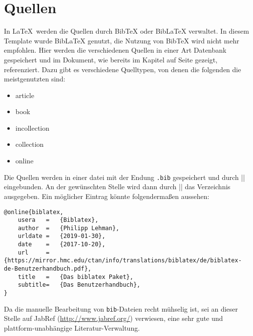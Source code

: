 
\chapter{Quellen}

In \LaTeX\ werden die Quellen durch BibTeX oder BibLaTeX verwaltet. 
In diesem Template wurde BibLaTeX genutzt, die Nutzung von BibTeX wird nicht mehr empfohlen.
Hier werden die verschiedenen Quellen in einer Art Datenbank gespeichert und im Dokument, wie bereits im Kapitel  auf Seite \pageref{ch:zitieren} gezeigt, referenziert. 
Dazu gibt es verschiedene Quelltypen, von denen die folgenden die meistgenutzten sind:\autocite[Vgl.][7]{biblatex}

\begin{itemize}
  \item article
  \item book
  \item incollection
  \item collection
  \item online
\end{itemize}

Die Quellen werden in einer datei mit der Endung \texttt{.bib} gespeichert und durch \befehl|| eingebunden. 
An der gewünschten Stelle wird dann durch \befehl|\printbibliography| das Verzeichnis ausgegeben. 
Ein möglicher Eintrag könnte folgendermaßen aussehen:

\begin{lstlisting}
@online{biblatex,
    usera	=	{Biblatex},
    author	=	{Philipp Lehman},
    urldate	=	{2019-01-30},
    date	=	{2017-10-20},
    url		=	{https://mirror.hmc.edu/ctan/info/translations/biblatex/de/biblatex-de-Benutzerhandbuch.pdf},
    title	=	{Das biblatex Paket},
    subtitle=   {Das Benutzerhandbuch},
}
\end{lstlisting}

Da die manuelle Bearbeitung von \texttt{bib}-Dateien recht mühselig ist, sei an dieser Stelle auf JabRef (\url{http://www.jabref.org/}) verwiesen, eine sehr gute und plattform-unabhängige Literatur-Verwaltung.